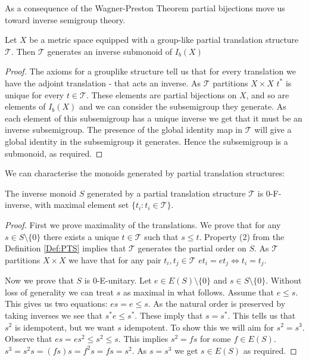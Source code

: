 \begin{corollary}
As a consequence of the Wagner-Preston Theorem \cite{MR1455373} partial bijections move us toward inverse semigroup theory.
\begin{proposition}\label{prop:P6}
Let $X$ be a metric space equipped with a group-like partial translation structure $\mathcal{T}$. Then $\mathcal{T}$ generates an inverse submonoid of $I_{b}(X)$
\end{proposition}
\begin{proof}
The axioms for a grouplike structure tell us that for every translation we have the adjoint translation - that acts an inverse. As $\mathcal{T}$ partitions $X \times X$ $t^{*}$ is unique for every $t \in \mathcal{T}$. These elements are partial bijections on $X$, and so are elements of $I_{b}(X)$ and we can consider the subsemigroup they generate. As each element of this subsemigroup has a unique inverse we get that it must be an inverse subsemigroup. The presence of the global identity map in $\mathcal{T}$ will give a global identity in the subsemigroup it generates. Hence the subsemigroup is a submonoid, as required.
\end{proof}

We can characterise the monoids generated by partial translation structures:

\begin{lemma}\label{Lem:PTS}
The inverse monoid $S$ generated by a partial translation structure $\mathcal{T}$ is 0-F-inverse, with maximal element set $\lbrace t_{i} : t_{i} \in \mathcal{T} \rbrace$. 
\end{lemma}
\begin{proof}
First we prove maximality of the translations. We prove that for any $s\in S \setminus \lbrace 0 \rbrace$ there exists a unique $t \in \mathcal{T}$ such that $s \leq t$. Property (2) from the Definition \ref{Def:PTS} implies that $\mathcal{T}$ generates the partial order on $S$. As $\mathcal{T}$ partitions $X \times X$ we have that for any pair $t_{i},t_{j}\in \mathcal{T}$ $et_{i}=et_{j} \Leftrightarrow t_{i}=t_{j}$. 

Now we prove that $S$ is $0$-E-unitary. Let $e\in E(S)\setminus \lbrace 0 \rbrace$ and $s\in S\setminus \lbrace 0 \rbrace$. Without loss of generality we can treat $s$ as maximal in what follows. Assume that $e \leq s$. This gives us two equations: $es=e \leq s$. As the natural order is preserved by taking inverses we see that $s^{*}e \leq s^{*}$. These imply that $s=s^{*}$. This tells us that $s^{2}$ is idempotent, but we want $s$ idempotent. To show this we will aim for $s^{2}=s^{3}$. Observe that $es=es^{2}\leq s^{2} \leq s$. This implies $s^{2}=fs$ for some $f\in E(S)$. $s^{3}=s^{2}s=(fs)s=f^{2}s=fs=s^{2}$. As $s=s^{3}$ we get $s \in E(S)$ as required.
\end{proof}


\end{corollary}

